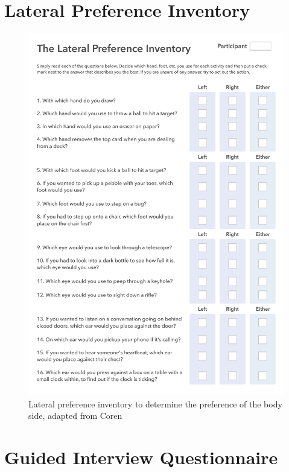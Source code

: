 \begin{appendices}
\section{Lateral Preference Inventory}
\begin{figure}[htb]
	\centering
	\begin{minipage}[t]{0.82\linewidth}
		\centering
		\includegraphics[width=1\linewidth]{Pictures/App_LateralPreference}
		\caption{Lateral preference inventory to determine the preference of the body side, adapted from Coren~\cite{Coren1993-lp}}
		\label{fig:App_DemographicDataHTG}
	\end{minipage}
\end{figure}

\clearpage

\section{Guided Interview Questionnaire}


\end{appendices}
